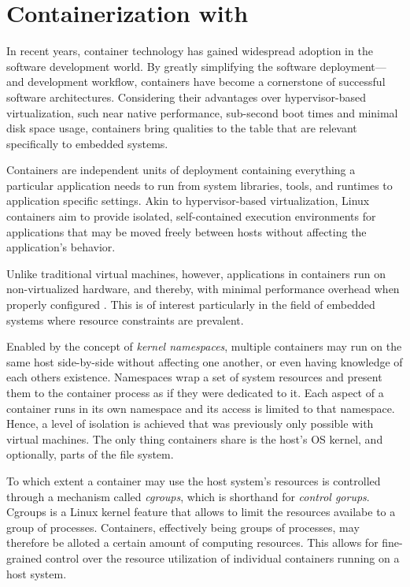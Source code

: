 
\section{Containerization with \docker}

In recent years, container technology has gained widespread adoption in the software development world. By greatly simplifying the software deployment—and development workflow, containers have become a cornerstone of successful software architectures.
Considering their advantages over hypervisor-based virtualization, such near native performance, sub-second boot times \cite{felter2015updated}\cite{morabito2015hypervisors} and minimal disk space usage, containers bring qualities to the table that are relevant specifically to embedded systems.

Containers are independent units of deployment containing everything a particular application needs to run from system libraries, tools, and runtimes to application specific settings. 
Akin to hypervisor-based virtualization, Linux containers aim to provide isolated, self-contained execution environments for applications that may be moved freely between hosts without affecting the application’s behavior.

Unlike traditional virtual machines, however, applications in containers run on non-virtualized hardware, and thereby, with minimal performance overhead when properly configured \cite{felter2015updated}\cite{morabito2015hypervisors}. This is of interest particularly in the field of embedded systems where resource constraints are prevalent.

Enabled by the concept of \emph{kernel namespaces}, multiple containers may run on the same host side-by-side without affecting one another, or even having knowledge of each others existence. 
Namespaces wrap a set of system resources and present them to the container process as if they were dedicated to it. Each aspect of a container runs in its own namespace and its access is limited to that namespace. Hence, a level of isolation is achieved that was previously only possible with virtual machines. The only thing containers share is the host’s OS kernel, and optionally, parts of the file system.

To which extent a container may use the host system's resources is controlled through a mechanism called \emph{cgroups}, which is shorthand for \emph{control gorups}. 
Cgroups is a Linux kernel feature that allows to limit the resources availabe to a group of processes. Containers, effectively being groups of processes, may therefore be alloted a certain amount of computing resources. This allows for fine-grained control over the resource utilization of individual containers running on a host system.

